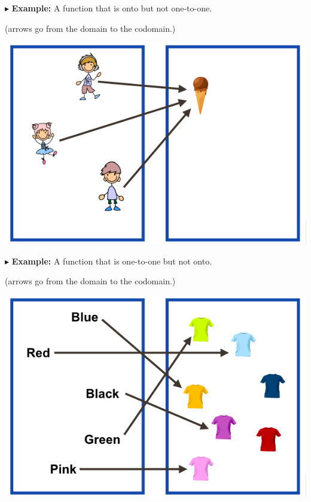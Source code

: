 \documentclass{ximera}
\begin{document}
$\blacktriangleright$ \textbf{Example:} A function that is onto but not one-to-one.  \\

\begin{center}
(arrows go from the domain to the codomain.)
\begin{image}
\includegraphics{pics/onto.png}
\end{image}
\end{center}







$\blacktriangleright$ \textbf{Example:} A function that is one-to-one but not onto.  \\

\begin{center}
(arrows go from the domain to the codomain.)
\begin{image}
\includegraphics{pics/onetoone.png}
\end{image}
\end{center}
\end{document}
